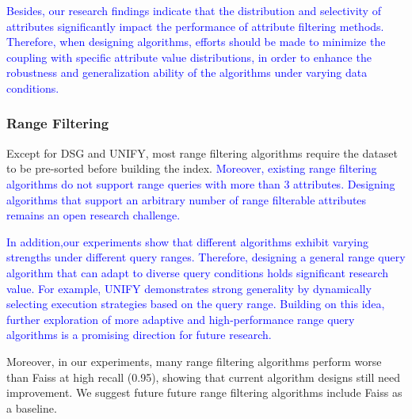 \documentclass[sigconf, nonacm]{acmart}
\begin{document}
{		
	\textcolor{blue}{
	Besides, our research findings indicate that the distribution and selectivity of attributes significantly impact the performance of attribute filtering methods. Therefore, when designing algorithms, efforts should be made to minimize the coupling with specific attribute value distributions, in order to enhance the robustness and generalization ability of the algorithms under varying data conditions.}
	
	
	\subsubsection{Range Filtering}
	Except for DSG and UNIFY, most range filtering algorithms require the dataset to be pre-sorted before building the index. \textcolor{blue}{Moreover, existing range filtering algorithms do not support range queries with more than 3 attributes.} \textcolor{blue}{Designing algorithms that support an arbitrary number of range filterable attributes remains an open research challenge.}
	

\textcolor{blue}{
In addition,our experiments show that different algorithms exhibit varying strengths under different query ranges. Therefore, designing a general range query algorithm that can adapt to diverse query conditions holds significant research value. For example, UNIFY demonstrates strong generality by dynamically selecting execution strategies based on the query range. Building on this idea, further exploration of more adaptive and high-performance range query algorithms is a promising direction for future research.}
	
Moreover, in our experiments, many range filtering algorithms perform worse than Faiss at high recall (0.95), showing that current algorithm designs still need improvement. We suggest future future range filtering algorithms include Faiss as a baseline.
	
}
\end{document}
